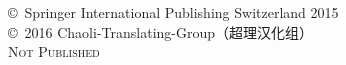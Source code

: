 \documentclass[11pt,fleqn,twoside]{book}
\begin{document}
\noindent \copyright\ Springer International Publishing Switzerland 2015 \\

\noindent \copyright\ 2016 Chaoli-Translating-Group（超理汉化组） \\ %

\noindent \textsc{Not Published}\\ %






\pagestyle{empty} %


\cleardoublepage %

\pagestyle{fancy} %





\cleardoublepage
{}
\tableofcontents %

\mainmatter




\end{document}

